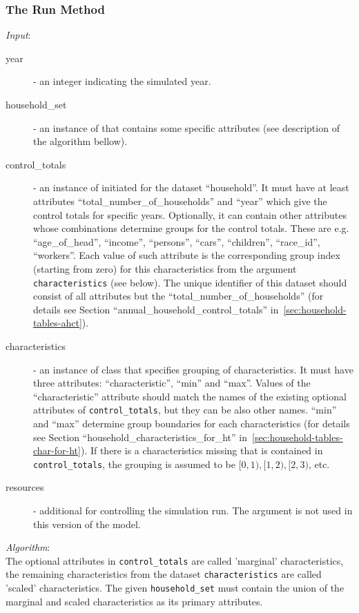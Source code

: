 \subsubsection{The Run Method}
%
{\it Input}:
\begin{description}
\item[year] - an integer indicating the simulated year.
\item[household_set] - an instance of  that contains some
  specific attributes (see description of the algorithm bellow).
\item[control_totals] - an instance of  initiated for
  the dataset ``household''. It must have at least attributes
  ``total_number_of_households'' and ``year'' which give the control totals
  for specific years. Optionally, it can contain other attributes whose
  combinations determine groups for the control totals.  These are e.g.
  ``age_of_head'', ``income'', ``persons'', ``cars'', ``children'',
  ``race_id'', ``workers''. Each value of such attribute is the corresponding
  group index (starting from zero) for this characteristics from the argument
  \verb|characteristics| (see below). The unique identifier of this dataset 
  should consist of all attributes but the ``total_number_of_households'' (for
  details see Section ``annual_household_control_totals''
  in~\ref{sec:household-tables-ahct}).
\item[characteristics] - an instance of class
   that specifies grouping of
  characteristics.  It must have three attributes: ``characteristic'', ``min''
  and ``max''.  Values of the ``characteristic'' attribute should match the
  names of the existing optional attributes of \verb|control_totals|, but they
  can be also other names. ``min'' and ``max'' determine group boundaries for
  each characteristics (for details see Section
  ``household_characteristics_for_ht'' in~\ref{sec:household-tables-char-for-ht}). If
  there is a characteristics missing that is contained in
  \verb|control_totals|, the grouping is assumed to be $[0,1), [1,2), [2,3)$,
  etc.
\item[resources] - additional  for controlling the
  simulation run. The argument is not used in this version of the model. 
\end{description}

{\it Algorithm}:~\\[1mm]
The optional attributes in \verb|control_totals| are called 'marginal'
characteristics, the remaining characteristics from the dataset 
\verb|characteristics| are called 'scaled' characteristics. The given
\verb|household_set| must contain the union of the marginal and scaled
characteristics as its primary attributes. \primaryattributesindex

